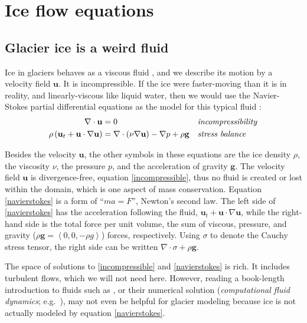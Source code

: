 \documentclass[letterpaper,final,12pt,reqno]{amsart}
\newcommand{\bg}{\mathbf{g}}
\newcommand{\bu}{\mathbf{u}}
\begin{document}
\section{Ice flow equations}  \label{sec:continuum}

\subsection*{Glacier ice is a weird fluid}  Ice in glaciers behaves as a viscous fluid \cite{GreveBlatter2009}, and we describe its motion by a velocity field $\mathbf{u}$.  It is incompressible.  If the ice were faster-moving than it is in reality, and linearly-viscous like liquid water, then we would use the Navier-Stokes partial differential equations as the model for this typical fluid \cite{Wesseling2001}:
\begin{align}
\nabla \cdot \mathbf{u} &= 0 &&\text{\emph{incompressibility}} \label{incompressible} \\
\rho \left(\mathbf{u}_t + \mathbf{u}\cdot\nabla \mathbf{u}\right) &= \nabla \cdot (\nu \nabla \mathbf{u}) - \nabla p + \rho \mathbf{g} &&\text{\emph{stress balance}} \label{navierstokes}
\end{align}

Besides the velocity $\bu$, the other symbols in these equations are the ice density $\rho$, the viscosity $\nu$, the pressure $p$, and the acceleration of gravity $\bg$.  The velocity field $\bu$ is divergence-free, equation \eqref{incompressible}, thus no fluid is created or lost within the domain, which is one aspect of mass conservation.  Equation \eqref{navierstokes} is a form of ``$ma=F$'', Newton's second law.  The left side of \eqref{navierstokes} has the acceleration following the fluid, $\mathbf{u}_t + \mathbf{u}\cdot\nabla \mathbf{u}$, while the right-hand side is the total force per unit volume, the sum of viscous, pressure, and gravity ($\rho \mathbf{g} = \left<0,0,-\rho g\right>$) forces, respectively.  Using $\sigma$ to denote the Cauchy stress tensor, the right side can be written $\nabla \cdot \sigma + \rho \mathbf{g}$.

The space of solutions to \eqref{incompressible} and \eqref{navierstokes} is rich.  It includes turbulent flows, which we will not need here.  However, reading a book-length introduction to fluids such as \cite{Acheson1990}, or their numerical solution (\emph{computational fluid dynamics}; e.g.~\cite{Wesseling2001}), may not even be helpful for glacier modeling because ice is not actually modeled by equation \eqref{navierstokes}.
\end{document}
